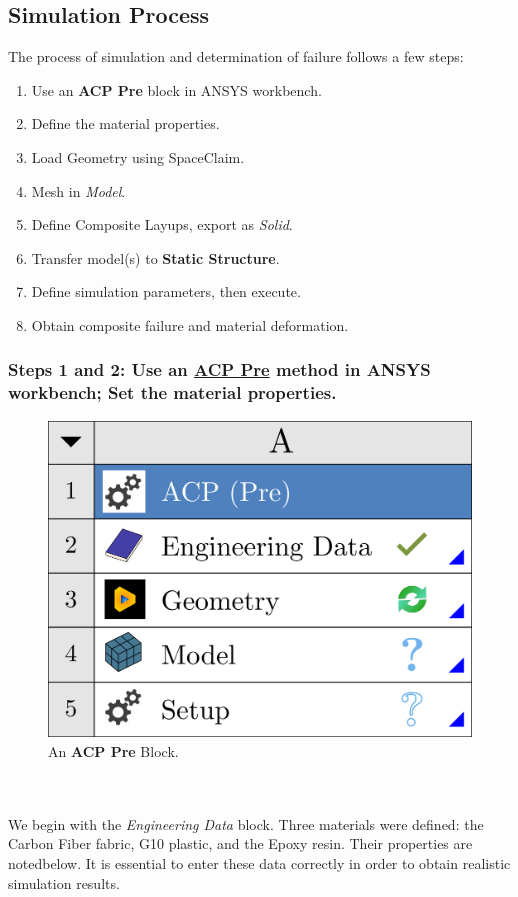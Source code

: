 \documentclass{amsdtx}
\begin{document}
\subsection{Simulation Process}
The process of simulation and determination of failure follows a few steps: 
\begin{multicols}{2}
\begin{enumerate}
	\item Use an \textbf{ACP Pre} block in ANSYS workbench.
	\item Define the material properties.
	\item Load Geometry using SpaceClaim.
	\item Mesh in \textit{Model}.
	\item Define Composite Layups, export as \textit{Solid}.
	\item Transfer model(s) to \textbf{Static Structure}.
	\item Define simulation parameters, then execute.
	\item Obtain composite failure and material deformation.
\end{enumerate}
\end{multicols}
\newpage
\subsubsection{Steps 1 and 2: Use an \underline{ACP Pre} method in ANSYS workbench; Set the material properties.}
\begin{multicols}{2}
	
\begin{figure}[H]
\centering
\includegraphics[scale=0.04]{ACPpre.pdf}	
\caption{An \textbf{ACP Pre} Block.}
\end{figure}
~\\\\We begin with the \textit{Engineering Data} block. Three materials were defined: the Carbon Fiber fabric, G10 plastic, and the Epoxy resin. Their properties are notedbelow. It is essential to enter these data correctly in order to obtain realistic simulation results.
\end{multicols}
~\\[-3em]
\end{document}
